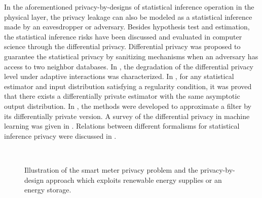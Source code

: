 \documentclass[g5paper,phd,electronic]{kthesis}
\numberwithin{theorem}{chapter}
\numberwithin{lemma}{chapter}
\numberwithin{proposition}{chapter}
\numberwithin{corollary}{chapter}
\numberwithin{remark}{chapter}
\numberwithin{property}{chapter}
\numberwithin{conjecture}{chapter}
\numberwithin{assumption}{chapter}
\numberwithin{algorithm}{chapter}
\begin{document}
In the aforementioned privacy-by-designs of statistical inference operation in the physical layer, the privacy leakage can also be modeled as a statistical inference made by an eavesdropper or adversary. Besides hypothesis test and estimation, the statistical inference risks have been discussed and evaluated in computer science through the differential privacy. Differential privacy \cite{dwork2006} was proposed to guarantee the statistical privacy by sanitizing mechanisms when an adversary has access to two neighbor databases. In \cite{kairouz2015}, the degradation of the differential privacy level under adaptive interactions was characterized. In \cite{smith2011}, for any statistical estimator and input distribution satisfying a regularity condition, it was proved that there exists a differentially private estimator with the same asymptotic output distribution. In \cite{leny2014}, the methods were developed to approximate a filter by its differentially private version. A survey of the differential privacy in machine learning was given in \cite{ji}. Relations between different formalisms for statistical inference privacy were discussed in \cite{barber}.

\begin{figure}[h]
\center
{}\\
\caption{Illustration of the smart meter privacy problem and the privacy-by-design approach which exploits renewable energy supplies or an energy storage.}
\label{figure1.3}
\end{figure}
\end{document}
